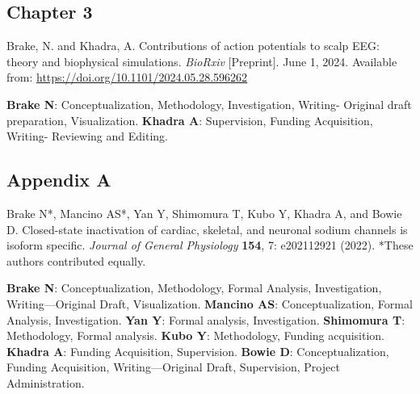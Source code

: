 \vspace{-.5em}
\subsection*{Chapter 3}
Brake, N. and Khadra, A. Contributions of action potentials to scalp EEG: theory and biophysical simulations. \textit{BioRxiv} [Preprint]. June 1, 2024. Available from: \url{https://doi.org/10.1101/2024.05.28.596262}

{\small \textbf{Brake N}: Conceptualization, Methodology, Investigation, Writing- Original draft preparation, Visualization. \textbf{Khadra A}: Supervision, Funding Acquisition, Writing- Reviewing and Editing.}

\vspace{-.5em}
\subsection*{Appendix A}

Brake N*, Mancino AS*, Yan Y, Shimomura T, Kubo Y, Khadra A, and Bowie D. Closed-state inactivation of cardiac, skeletal, and neuronal sodium channels is isoform specific. \textit{Journal of General Physiology} \textbf{154}, 7: e202112921 (2022). *These authors contributed equally.

{\small \textbf{Brake N}: Conceptualization, Methodology, Formal Analysis, Investigation, Writing—Original Draft, Visualization.  \textbf{Mancino AS}: Conceptualization, Formal Analysis, Investigation. \textbf{Yan Y}: Formal analysis, Investigation. \textbf{Shimomura T}: Methodology, Formal analysis. \textbf{Kubo Y}: Methodology, Funding acquisition. \textbf{Khadra A}: Funding Acquisition, Supervision. \textbf{Bowie D}: Conceptualization, Funding Acquisition, Writing—Original Draft, Supervision, Project Administration.}




\setlength{\parskip}{6pt}
\setlength{\parindent}{17pt}